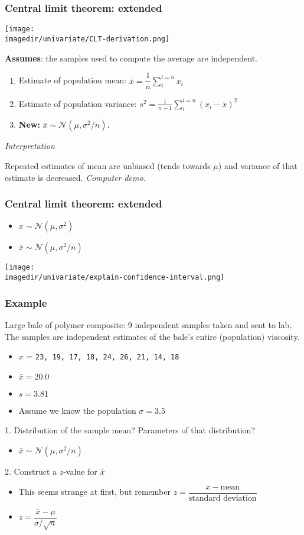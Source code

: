 \begin{frame}\frametitle{Central limit theorem: extended}

	\texttt{[image: \\imagedir/univariate/CLT-derivation.png]}

	\textbf{Assumes}: the samples used to compute the average are independent.
	\begin{enumerate}
		\item	Estimate of population mean: $\bar{x} = \displaystyle \dfrac{1}{n} \sum_i^{i=n}{x_i}$
		\item	Estimate of population variance: $s^2 =\displaystyle \frac{1}{n-1}\sum_i^{i=n}{(x_i - \bar{x})^2}$
		\item	\textbf{New:} $\bar{x} \sim \mathcal{N}\left(\mu, \sigma^2/n \right)$.
	\end{enumerate}

	\emph{Interpretation}

	Repeated estimates of mean are unbiased (tends towards $\mu$) and variance of that estimate is decreased. \emph{Computer demo.}
\end{frame}

\begin{frame}\frametitle{Central limit theorem: extended}
	\begin{itemize}
		\item	$x \sim \mathcal{N}\left(\mu, \sigma^2 \right)$
		\item	$\bar{x} \sim \mathcal{N}\left(\mu, \sigma^2/n \right)$
	\end{itemize}

	\texttt{[image: \\imagedir/univariate/explain-confidence-interval.png]}
\end{frame}

\begin{frame}\frametitle{Example}

	Large bale of polymer composite: 9 independent samples taken and sent to lab. The samples are independent estimates of the bale's entire (population) viscosity.
	\begin{itemize}
		\item	$x$ = \texttt{23, 19, 17, 18, 24, 26, 21, 14, 18}
		\item	$\bar{x} = 20.0$
		\item	$s=3.81$
		\item	Assume we know the population $\sigma=3.5$
	\end{itemize}

	1. Distribution of the sample mean? Parameters of that distribution? 
	\begin{itemize}
		\item$\bar{x} \sim \mathcal{N}\left(\mu, \sigma^2/n \right)$ 
	\end{itemize}
	2. Construct a $z$-value for $\bar{x} $
	\begin{itemize}
		\item	This seems strange at first, but remember $z = \dfrac{x - \text{mean}}{\text{standard deviation}}$
		\item	$z = \dfrac{\bar{x} -\mu}{\sigma/\sqrt{n}}$
	\end{itemize}
\end{frame}

